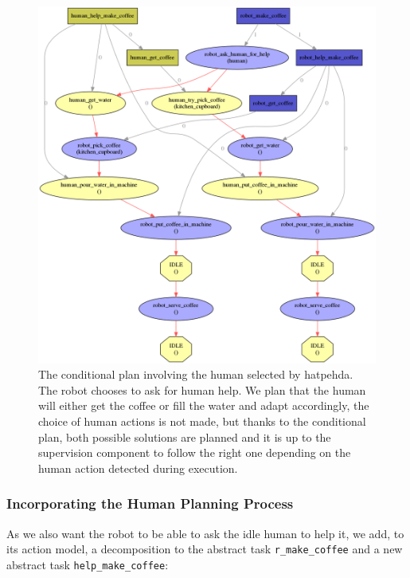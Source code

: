 \documentclass[a4paper,11pt,twoside]{StyleThese}
\begin{document}
\begin{figure}[hbtp]
\centering
\includegraphics[width=\textwidth]{figures/chapter4/Chap4CoopNoDivergence.png}
\caption{The conditional plan involving the human selected by \acrshort{hatpehda}. The robot chooses to ask for human help. We plan that the human will either get the coffee or fill the water and adapt accordingly, the choice of human actions is not made, but thanks to the conditional plan, both possible solutions are planned and it is up to the supervision component to follow the right one depending on the human action detected during execution.}
\label{fig:chap4coffeecoopnodivergence}
\end{figure}


\subsubsection{Incorporating the Human Planning Process}
As we also want the robot to be able to ask the idle human to help it, we add, to its action model, a decomposition to the abstract task \verb'r_make_coffee' and a new abstract task \verb'help_make_coffee':
\end{document}
